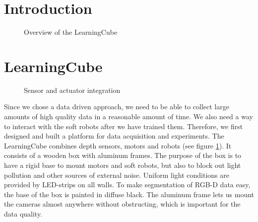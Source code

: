 \documentclass[letterpaper, 10 pt, conference]{ieeeconf}  %
\begin{document}
\section{Introduction}
\blindtext[3]
\begin{figure}[htpb]
      \centering
        \caption{Overview of the LearningCube}
        \label{fig:cube}
\end{figure}
\clearpage

\section{LearningCube}
\begin{figure}[htpb]
      \centering
        \caption{Sensor and actuator integration}
        \label{fig:setup}
\end{figure}

Since we chose a data driven approach, we need to be able to collect large amounts of high quality data in a reasonable amount of time. We also need a way to interact with the soft robots after we have trained them. Therefore, we first designed and built a platform for data acquisition and experiments. The LearningCube combines depth sensors, motors and robots (see figure \ref{fig:cube}). It consists of a wooden box with aluminum frames. The purpose of the box is to have a rigid base to mount motors and soft robots, but also to block out light pollution and other sources of external noise. Uniform light conditions are provided by LED-strips on all walls. To make segmentation of RGB-D data easy, the base of the box is painted in diffuse black. The aluminum frame lets us mount the cameras almost anywhere without obstructing, which is important for the data quality. 
\end{document}
